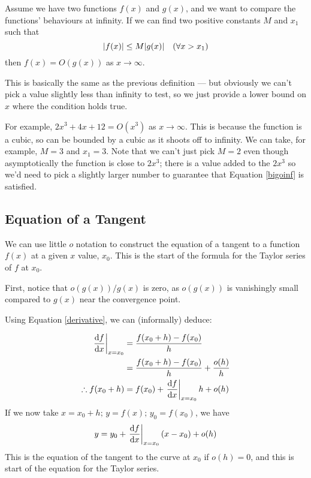 \documentclass{article}
\begin{document}
	\begin{definition}
		Assume we have two functions $f(x)$ and $g(x)$, and we want to compare the functions' behaviours at infinity. If we can find two positive constants $M$ and $x_1$ such that
		\begin{equation}\label{bigoinf}
			\abs{f(x)} \leq M\abs{g(x)} \quad(\forall x > x_1)
		\end{equation}
		then $f(x) = O(g(x))$ as $x \to \infty$.
	\end{definition}

	This is basically the same as the previous definition --- but obviously we can't pick a value slightly less than infinity to test, so we just provide a lower bound on $x$ where the condition holds true.
	
	For example, $2x^3 + 4x + 12 = O(x^3)$ as $x \to \infty$. This is because the function is a cubic, so can be bounded by a cubic as it shoots off to infinity. We can take, for example, $M = 3$ and $x_1 = 3$. Note that we can't just pick $M=2$ even though asymptotically the function is close to $2x^3$; there is a value added to the $2x^3$ so we'd need to pick a slightly larger number to guarantee that Equation \eqref{bigoinf} is satisfied.
	
	\subsection{Equation of a Tangent}
	We can use little $o$ notation to construct the equation of a tangent to a function $f(x)$ at a given $x$ value, $x_0$. This is the start of the formula for the Taylor series of $f$ at $x_0$.
	
	First, notice that $o(g(x))/g(x)$ is zero, as $o(g(x))$ is vanishingly small compared to $g(x)$ near the convergence point.
	
	Using Equation \eqref{derivative}, we can (informally) deduce:
	
	\begin{align*}
		\eval{\frac{\dd f}{\dd x}}_{x=x_0} &= \frac{f(x_0 + h) - f(x_0)}{h} \\
		&= \frac{f(x_0 + h) - f(x_0)}{h} + \frac{o(h)}{h} \\
		\therefore f(x_0 + h) &= f(x_0) + \eval{\frac{\dd f}{\dd x}}_{x=x_0} h + o(h)
	\end{align*}
	If we now take $x=x_0+h;\,y=f(x);\,y_0=f(x_0)$, we have
	\[ y = y_0 + \eval{\frac{\dd f}{\dd x}}_{x=x_0}(x - x_0) + o(h) \]
	This is the equation of the tangent to the curve at $x_0$ if $o(h)=0$, and this is start of the equation for the Taylor series.
	
\end{document}

